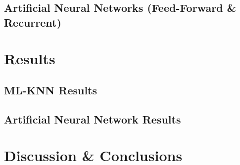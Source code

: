 \documentclass{article}
\begin{document}
\subsection{Artificial Neural Networks (Feed-Forward \& Recurrent)}

\section{Results}

\subsection{ML-KNN Results}

\subsection{Artificial Neural Network Results}

\section{Discussion \& Conclusions}

\newpage
\printbibliography
\end{document}

